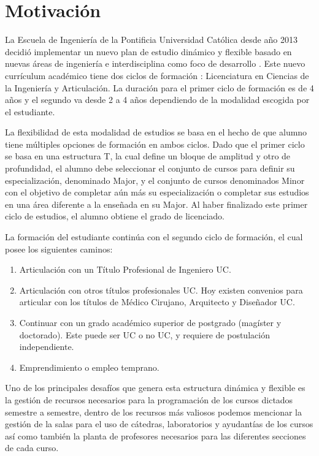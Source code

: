 \section{Motivación \label{sec:motivation}}
La Escuela de Ingeniería de la Pontificia Universidad Católica desde año 2013 decidió implementar un nuevo plan de estudio dinámico y flexible basado en nuevas áreas de ingeniería e
interdisciplina como foco de desarrollo \cite{ingwebsite}. Este nuevo currículum académico tiene dos ciclos de formación : Licenciatura en Ciencias de la Ingeniería y Articulación.
La duración para el primer ciclo de formación es de 4 años y el segundo va desde 2 a 4 años dependiendo de la modalidad escogida por el estudiante.

La flexibilidad de esta modalidad de estudios se basa en el hecho de que alumno tiene múltiples opciones de formación en ambos ciclos. Dado que el primer ciclo se basa en una estructura
T, la cual define un bloque de amplitud y otro de profundidad, el alumno debe seleccionar el conjunto de cursos para definir su especialización, denominado Major, y el conjunto de cursos
denominados Minor con el objetivo de completar aún más su especialización o completar sus estudios en una área diferente a la enseñada en su Major. Al haber finalizado este primer ciclo
de estudios, el alumno obtiene  el grado de licenciado.

La formación del estudiante continúa con el segundo ciclo de formación, el cual posee los siguientes caminos:

\begin{enumerate}
\item Articulación con un Título Profesional de Ingeniero UC.
\item Articulación con otros títulos profesionales UC. Hoy existen convenios para articular con los títulos de Médico Cirujano, Arquitecto y Diseñador UC.
\item Continuar con un grado académico superior de postgrado (magíster y doctorado). Este puede ser UC o no UC, y requiere de postulación independiente.
\item Emprendimiento o empleo temprano.
\end{enumerate}

Uno de los principales desafíos que genera esta estructura dinámica y flexible es la gestión de recursos necesarios para la programación de los cursos dictados semestre a semestre, dentro de los recursos más valiosos podemos mencionar la gestión de la salas para el uso de cátedras, laboratorios y ayudantías de los cursos así como también la planta de profesores necesarios para las diferentes secciones de cada curso.

